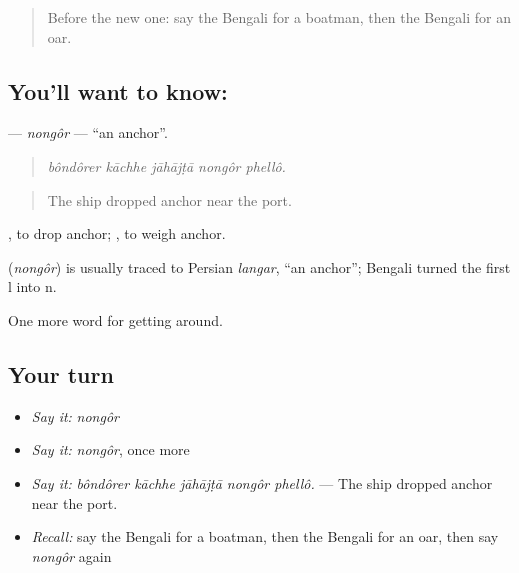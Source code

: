 \label{lesson:BN-C396-nongor}



\begin{quote}
Before the new one: say the Bengali for a boatman, then the Bengali for an oar.
\end{quote}

\subsection*{You'll want to know: }
\textbf{} — \emph{nongôr} — \textquotedblleft{}an anchor\textquotedblright{}.

\begin{quote}
    
\end{quote}

\begin{quote}
\emph{bôndôrer kāchhe jāhājṭā nongôr phellô.}
\end{quote}

\begin{quote}
The ship dropped anchor near the port.
\end{quote}

 , to drop anchor;  , to weigh anchor.

\begin{cousinweb}
\textbf{} (\emph{nongôr}) is usually traced to Persian \emph{langar}, \textquotedblleft{}an anchor\textquotedblright{}; Bengali turned the first l into n.
\end{cousinweb}

\begin{grammarlens}[title={What you've built}]
One more word for getting around.
\end{grammarlens}

\subsection*{Your turn}
\begin{itemize}
\raggedright
  \item \emph{Say it:} \emph{nongôr}
  \item \emph{Say it:} \emph{nongôr}, once more
  \item \emph{Say it:} \emph{bôndôrer kāchhe jāhājṭā nongôr phellô.} — The ship dropped anchor near the port.
  \item \emph{Recall:} say the Bengali for a boatman, then the Bengali for an oar, then say \emph{nongôr} again
\end{itemize}

